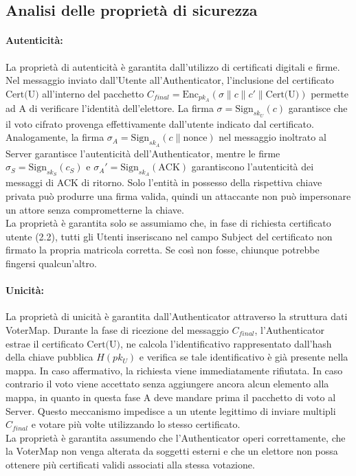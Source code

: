 \subsection{Analisi delle proprietà di sicurezza}

\paragraph{Autenticità:}
La proprietà di autenticità è garantita dall'utilizzo di certificati digitali e firme. Nel messaggio inviato dall'Utente all'Authenticator, l'inclusione del certificato $\text{Cert(U)}$ all'interno del pacchetto $C_{final} = \text{Enc}_{pk_A}(\sigma \| c \| c' \| \text{Cert(U)})$ permette ad A di verificare l'identità dell'elettore. La firma $\sigma = \text{Sign}_{sk_U}(c)$ garantisce che il voto cifrato provenga effettivamente dall'utente indicato dal certificato. Analogamente, la firma $\sigma_A = \text{Sign}_{sk_A}(c \| \text{nonce})$ nel messaggio inoltrato al Server garantisce l'autenticità dell'Authenticator, mentre le firme $\sigma_S = \text{Sign}_{sk_S}(c_S)$ e $\sigma_A' = \text{Sign}_{sk_A}(\text{ACK})$ garantiscono l'autenticità dei messaggi di ACK di ritorno. Solo l'entità in possesso della rispettiva chiave privata può produrre una firma valida, quindi un attaccante non può impersonare un attore senza comprometterne la chiave. \\
La proprietà è garantita solo se assumiamo che, in fase di richiesta certificato utente (2.2), tutti gli Utenti inseriscano nel campo Subject del certificato non firmato la propria matricola corretta. Se così non fosse, chiunque potrebbe fingersi qualcun'altro.

\paragraph{Unicità:}
La proprietà di unicità è garantita dall'Authenticator attraverso la struttura dati VoterMap. Durante la fase di ricezione del messaggio $C_{final}$, l'Authenticator estrae il certificato $\text{Cert(U)}$, ne calcola l'identificativo rappresentato dall'hash della chiave pubblica $H(pk_U)$ e verifica se tale identificativo è già presente nella mappa. In caso affermativo, la richiesta viene immediatamente rifiutata. In caso contrario il voto viene accettato senza aggiungere ancora alcun elemento alla mappa, in quanto in questa fase A deve mandare prima il pacchetto di voto al Server. Questo meccanismo impedisce a un utente legittimo di inviare multipli $C_{final}$ e votare più volte utilizzando lo stesso certificato.\\
La proprietà è garantita assumendo che l'Authenticator operi correttamente, che la VoterMap non venga alterata da soggetti esterni e che un elettore non possa ottenere più certificati validi associati alla stessa votazione.

